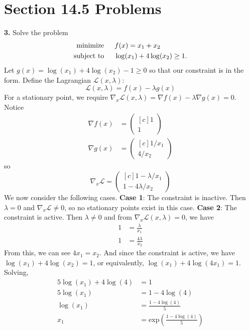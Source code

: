 \documentclass{article}
\begin{document}
\section*{Section 14.5 Problems}
\textbf{3.} Solve the problem
\begin{align*}
    \text{minimize} \hspace{1.5em} &f(x) = x_1 + x_2\\
    \text{subject to} \hspace{1.5em} &\log(x_1) + 4\log(x_2) \geq 1.
\end{align*}
Let $g(x) = \log(x_1) + 4\log(x_2) - 1 \geq 0$ so that our constraint is in the  form. Define the Lagrangian $\mathscr{L}(x,\lambda)$:
\[\mathscr{L}(x, \lambda) = f(x) - \lambda g(x)\]
For a stationary point, we require $\nabla_x\mathscr{L}(x,\lambda) = \nabla f(x) - \lambda\nabla g(x) = 0$. Notice
\begin{align*}
    \nabla f(x) &= \begin{pmatrix*}[c]
        1\\
        1
    \end{pmatrix*}\\
    \nabla g(x) &= \begin{pmatrix*}[c]
        1/x_1\\
        4/x_2
    \end{pmatrix*}
\end{align*}    
so 
\[\nabla_x\mathscr{L} = \begin{pmatrix*}[c]
    1 - \lambda/x_1\\
    1 - 4\lambda/x_2
\end{pmatrix*}\]
We now consider the following cases.
\newline\newline
\textbf{Case 1}: The constraint is inactive. Then $\lambda = 0$ and $\nabla_x\mathscr{L} \neq 0$, so no stationary points exist in this case.
\newline\newline
\textbf{Case 2}: The constraint is active. Then $\lambda \neq 0$ and from $\nabla_x\mathscr{L}(x,\lambda) = 0$, we have
\begin{align*}
    1 &= \frac{\lambda}{x_1}\\
    1 &= \frac{4\lambda}{x_2}
\end{align*}
From this, we can see $4x_1 = x_2$. And since the constraint is active, we have $\log(x_1) + 4\log(x_2) = 1$, or equivalently, $\log(x_1) + 4\log(4x_1) = 1$. Solving,
\begin{align*}
    5\log(x_1) +4\log(4) &= 1\\
    5\log(x_1) &= 1 - 4\log(4)\\
    \log(x_1) &= \frac{1 - 4\log(4)}{5}\\
    x_1 &= \text{exp}\left(\frac{1 - 4\log(4)}{5}\right)
\end{align*}
\end{document}
